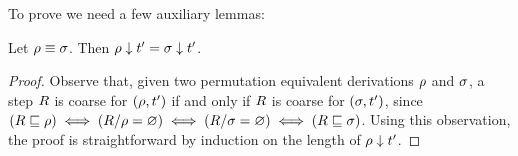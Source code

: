 
To prove  we need a few
auxiliary lemmas:

\begin{lemma}
Let $\rho \equiv \sigma$. Then $\rho \downarrow t' = \sigma \downarrow t'$.
\end{lemma}
\begin{proof}
Observe that, given two permutation equivalent derivations $\rho$ and $\sigma$,
a step $R$ is coarse for $(\rho,t')$ if and only if $R$ is coarse for $(\sigma,t')$,
since
$
  (R \sqsubseteq \rho) \iff (R/\rho = \varnothing) \iff (R/\sigma = \varnothing) \iff (R \sqsubseteq \sigma)
$.
Using this observation, the proof is straightforward by induction on the length of $\rho \downarrow t'$.
\end{proof}

